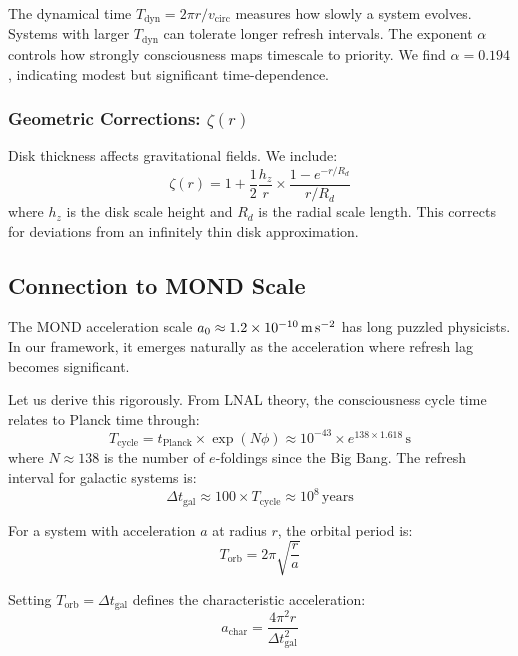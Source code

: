 \documentclass[twocolumn,prd,amsmath,amssymb,aps,superscriptaddress,nofootinbib]{revtex4-2}
\newcommand{\azero}{a_0}
\begin{document}
The dynamical time $T_{\text{dyn}} = 2\pi r/v_{\text{circ}}$ measures how slowly a system evolves. Systems with larger $T_{\text{dyn}}$ can tolerate longer refresh intervals. The exponent $\alpha$ controls how strongly consciousness maps timescale to priority. We find $\alpha = 0.194$, indicating modest but significant time-dependence.

\subsubsection{Geometric Corrections: $\zeta(r)$}

Disk thickness affects gravitational fields. We include:
\begin{equation}
\zeta(r) = 1 + \frac{1}{2}\frac{h_z}{r} \times \frac{1 - e^{-r/R_d}}{r/R_d}
\label{eq:geometric}
\end{equation}
where $h_z$ is the disk scale height and $R_d$ is the radial scale length. This corrects for deviations from an infinitely thin disk approximation.

\subsection{Connection to MOND Scale}

The MOND acceleration scale $\azero \approx 1.2 \times 10^{-10}\,\text{m\,s}^{-2}$ has long puzzled physicists. In our framework, it emerges naturally as the acceleration where refresh lag becomes significant.

Let us derive this rigorously. From LNAL theory, the consciousness cycle time relates to Planck time through:
\begin{equation}
T_{\text{cycle}} = t_{\text{Planck}} \times \exp(N\phi) \approx 10^{-43} \times e^{138 \times 1.618} \,\text{s}
\end{equation}
where $N \approx 138$ is the number of $e$-foldings since the Big Bang. The refresh interval for galactic systems is:
\begin{equation}
\Delta t_{\text{gal}} \approx 100 \times T_{\text{cycle}} \approx 10^8 \,\text{years}
\end{equation}

For a system with acceleration $a$ at radius $r$, the orbital period is:
\begin{equation}
T_{\text{orb}} = 2\pi\sqrt{\frac{r}{a}}
\end{equation}

Setting $T_{\text{orb}} = \Delta t_{\text{gal}}$ defines the characteristic acceleration:
\begin{equation}
a_{\text{char}} = \frac{4\pi^2 r}{\Delta t_{\text{gal}}^2}
\end{equation}
\end{document}
